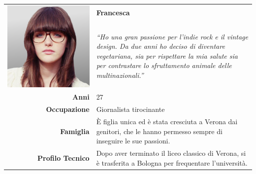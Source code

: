 \begin{table}[H]
	\begin{centering}
	\begin{tabular} { | r  p{10cm} | }
		\hline
		\multirow{2}{*}{
			\begin{minipage}{.18 \textheight}
				\vspace{0.1in}
				\includegraphics[width=\linewidth]{img/personas/francesca.png}
			\end{minipage}
		}
	 	& \vspace{0.1 in}\Large\textbf{Francesca} \\ 
		& \vspace{0.1 in}\large{\emph{``Ho una gran passione per l'indie rock e
il vintage design. Da due anni ho deciso di diventare vegetariana, sia
per rispettare la mia salute sia per contrastare lo sfruttamento animale
delle multinazionali.''}}\\[8ex] 
		\hline
		\textbf{Anni} & 27 \\ \hline
		\textbf{Occupazione} & Giornalista tirocinante \\ \hline
		\textbf{Famiglia} & È figlia unica ed è stata cresciuta 
a Verona dai genitori, che le hanno permesso sempre di inseguire le sue
passioni.\\ \hline
		\textbf{Profilo Tecnico} & Dopo aver terminato il liceo classico
di Verona, si è trasferita a Bologna per frequentare l'università.

\end{tabular}
\end{centering}
\end{table}
